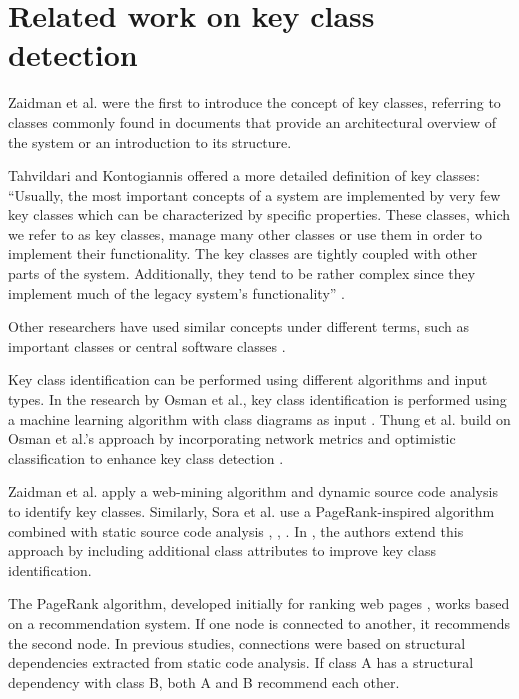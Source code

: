 \section{Related work on key class detection} %
\label{sec:key_related_work}

\hspace{4em}Zaidman et al. \cite{ZaidmanJurnal} were the first to introduce the concept of key classes, referring to classes commonly found in documents that provide an architectural overview of the system or an introduction to its structure. 

Tahvildari and Kontogiannis offered a more detailed definition of key classes: “Usually, the most important concepts of a system are implemented by very few key classes which can be characterized by specific properties. These classes, which we refer to as key classes, manage many other classes or use them in order to implement their functionality. The key classes are tightly coupled with other parts of the system. Additionally, they tend to be rather complex since they implement much of the legacy system’s functionality” \cite{Tahvildari2004ImprovingDQ}.

Other researchers have used similar concepts under different terms, such as important classes \cite{Meyer2014IdentifyingIC} or central software classes \cite{CentralClassesSteidl}. 

Key class identification can be performed using different algorithms and input types. In the research by Osman et al., key class identification is performed using a machine learning algorithm with class diagrams as input \cite{6676885}. Thung et al. build on Osman et al.’s approach by incorporating network metrics and optimistic classification to enhance key class detection \cite{rocclasification}. 

Zaidman et al. \cite{ZaidmanJurnal} apply a web-mining algorithm and dynamic source code analysis to identify key classes. Similarly, Sora et al. use a PageRank-inspired algorithm combined with static source code analysis \cite{PagerankENASE}, \cite{enase15}, \cite{PagerankSACI}. In \cite{Finding-key-classes}, the authors extend this approach by including additional class attributes to improve key class identification. 

The PageRank algorithm, developed initially for ranking web pages \cite{ilprints422}, works based on a recommendation system. If one node is connected to another, it recommends the second node. In previous studies, connections were based on structural dependencies extracted from static code analysis. If class A has a structural dependency with class B, both A and B recommend each other.

